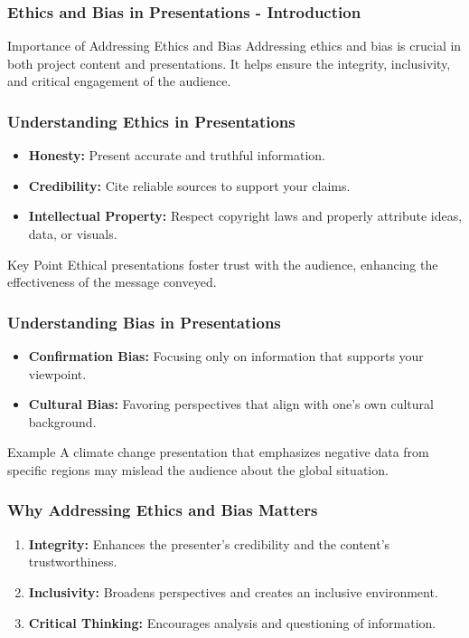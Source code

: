 \documentclass{beamer}
\begin{document}
\begin{frame}[fragile]
    \frametitle{Ethics and Bias in Presentations - Introduction}
    \begin{block}{Importance of Addressing Ethics and Bias}
        Addressing ethics and bias is crucial in both project content and presentations. It helps ensure the integrity, inclusivity, and critical engagement of the audience.
    \end{block}
\end{frame}

\begin{frame}[fragile]
    \frametitle{Understanding Ethics in Presentations}
    \begin{itemize}
        \item \textbf{Honesty:} Present accurate and truthful information.
        \item \textbf{Credibility:} Cite reliable sources to support your claims.
        \item \textbf{Intellectual Property:} Respect copyright laws and properly attribute ideas, data, or visuals.
    \end{itemize}
    \begin{block}{Key Point}
        Ethical presentations foster trust with the audience, enhancing the effectiveness of the message conveyed.
    \end{block}
\end{frame}

\begin{frame}[fragile]
    \frametitle{Understanding Bias in Presentations}
    \begin{itemize}
        \item \textbf{Confirmation Bias:} Focusing only on information that supports your viewpoint.
        \item \textbf{Cultural Bias:} Favoring perspectives that align with one's own cultural background.
    \end{itemize}
    \begin{block}{Example}
        A climate change presentation that emphasizes negative data from specific regions may mislead the audience about the global situation.
    \end{block}
\end{frame}

\begin{frame}[fragile]
    \frametitle{Why Addressing Ethics and Bias Matters}
    \begin{enumerate}
        \item \textbf{Integrity:} Enhances the presenter’s credibility and the content’s trustworthiness.
        \item \textbf{Inclusivity:} Broadens perspectives and creates an inclusive environment.
        \item \textbf{Critical Thinking:} Encourages analysis and questioning of information.
    \end{enumerate}
\end{frame}
\end{document}
